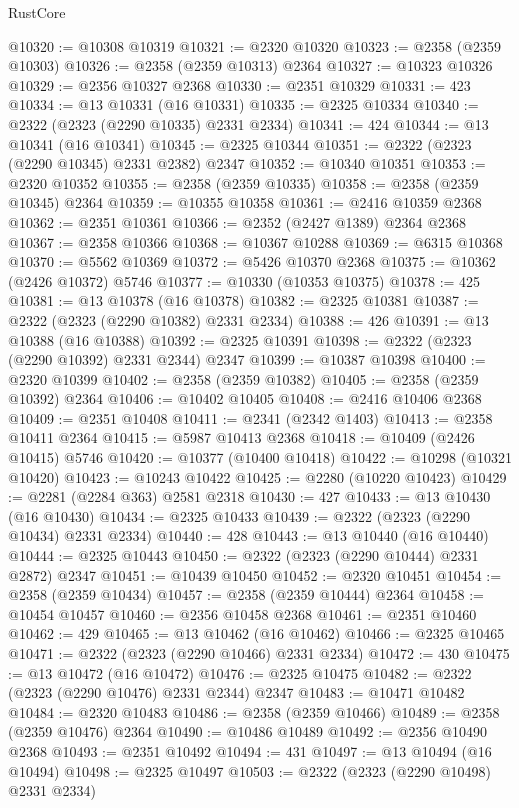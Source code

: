 \begin{lexlean}{RustCore}
\begin{coremodule}
@10320 := @10308 @10319
@10321 := @2320 @10320
@10323 := @2358 (@2359 @10303)
@10326 := @2358 (@2359 @10313) @2364
@10327 := @10323 @10326
@10329 := @2356 @10327 @2368
@10330 := @2351 @10329
@10331 := 423
@10334 := @13 @10331 (@16 @10331)
@10335 := @2325 @10334
@10340 := @2322 (@2323 (@2290 @10335) @2331 @2334)
@10341 := 424
@10344 := @13 @10341 (@16 @10341)
@10345 := @2325 @10344
@10351 := @2322 (@2323 (@2290 @10345) @2331 @2382) @2347
@10352 := @10340 @10351
@10353 := @2320 @10352
@10355 := @2358 (@2359 @10335)
@10358 := @2358 (@2359 @10345) @2364
@10359 := @10355 @10358
@10361 := @2416 @10359 @2368
@10362 := @2351 @10361
@10366 := @2352 (@2427 @1389) @2364 @2368
@10367 := @2358 @10366
@10368 := @10367 @10288
@10369 := @6315 @10368
@10370 := @5562 @10369
@10372 := @5426 @10370 @2368
@10375 := @10362 (@2426 @10372) @5746
@10377 := @10330 (@10353 @10375)
@10378 := 425
@10381 := @13 @10378 (@16 @10378)
@10382 := @2325 @10381
@10387 := @2322 (@2323 (@2290 @10382) @2331 @2334)
@10388 := 426
@10391 := @13 @10388 (@16 @10388)
@10392 := @2325 @10391
@10398 := @2322 (@2323 (@2290 @10392) @2331 @2344) @2347
@10399 := @10387 @10398
@10400 := @2320 @10399
@10402 := @2358 (@2359 @10382)
@10405 := @2358 (@2359 @10392) @2364
@10406 := @10402 @10405
@10408 := @2416 @10406 @2368
@10409 := @2351 @10408
@10411 := @2341 (@2342 @1403)
@10413 := @2358 @10411 @2364
@10415 := @5987 @10413 @2368
@10418 := @10409 (@2426 @10415) @5746
@10420 := @10377 (@10400 @10418)
@10422 := @10298 (@10321 @10420)
@10423 := @10243 @10422
@10425 := @2280 (@10220 @10423)
@10429 := @2281 (@2284 @363) @2581 @2318
@10430 := 427
@10433 := @13 @10430 (@16 @10430)
@10434 := @2325 @10433
@10439 := @2322 (@2323 (@2290 @10434) @2331 @2334)
@10440 := 428
@10443 := @13 @10440 (@16 @10440)
@10444 := @2325 @10443
@10450 := @2322 (@2323 (@2290 @10444) @2331 @2872) @2347
@10451 := @10439 @10450
@10452 := @2320 @10451
@10454 := @2358 (@2359 @10434)
@10457 := @2358 (@2359 @10444) @2364
@10458 := @10454 @10457
@10460 := @2356 @10458 @2368
@10461 := @2351 @10460
@10462 := 429
@10465 := @13 @10462 (@16 @10462)
@10466 := @2325 @10465
@10471 := @2322 (@2323 (@2290 @10466) @2331 @2334)
@10472 := 430
@10475 := @13 @10472 (@16 @10472)
@10476 := @2325 @10475
@10482 := @2322 (@2323 (@2290 @10476) @2331 @2344) @2347
@10483 := @10471 @10482
@10484 := @2320 @10483
@10486 := @2358 (@2359 @10466)
@10489 := @2358 (@2359 @10476) @2364
@10490 := @10486 @10489
@10492 := @2356 @10490 @2368
@10493 := @2351 @10492
@10494 := 431
@10497 := @13 @10494 (@16 @10494)
@10498 := @2325 @10497
@10503 := @2322 (@2323 (@2290 @10498) @2331 @2334)

\end{coremodule}
\end{lexlean}
